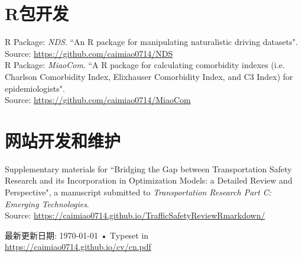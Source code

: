 \documentclass[11pt, a4paper]{article}
\newcommand{\years}[1]{\marginnote{\scriptsize #1}}
\begin{document}
\section*{R包开发}
\years{2019}R Package: \emph{NDS}. ``An R package for manipulating naturalistic driving datasets".\\ Source: \href{https://github.com/caimiao0714/NDS}{https://github.com/caimiao0714/NDS}\\
\years{2017}R Package: \emph{MiaoCom}. ``A R package for calculating comorbidity indexes (i.e. Charlson Comorbidity Index, Elixhauser Comorbidity Index, and C3 Index) for epidemiologists".\\ Source: \href{https://github.com/caimiao0714/MiaoCom}{https://github.com/caimiao0714/MiaoCom}

\section*{网站开发和维护}
\years{2019}Supplementary materials for ``Bridging the Gap between Transportation Safety Research and its Incorporation in Optimization Models: a Detailed Review and Perspective", a manuscript submitted to \emph{Transportation Research Part C: Emerging Technologies}.\\ Source: \href{https://caimiao0714.github.io/TrafficSafetyReviewRmarkdown/}{https://caimiao0714.github.io/TrafficSafetyReviewRmarkdown/}


\vfill{}

\begin{center}
{\scriptsize  最新更新日期: \today\- •\- 
Typeset in \href{https://caimiao0714.github.io/cv/cn.pdf}{
\XeTeX }\\
\href{https://caimiao0714.github.io/cv/cn.pdf}{https://caimiao0714.github.io/cv/cn.pdf}}
\end{center}
\end{document}

